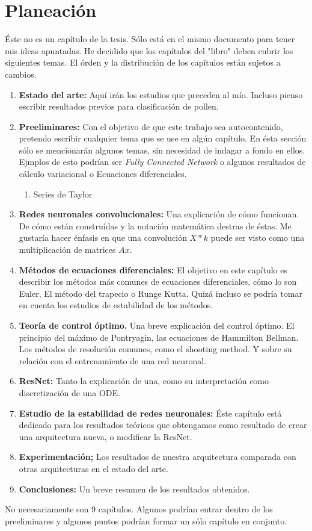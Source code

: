 \chapter{Planeación}
    Éste no es un capítulo de la tesis. Sólo está en el mismo documento para tener mis ideas apuntadas.
    He decidido que los capítulos del "libro" deben cubrir los siguientes temas. El órden y la distribución de los capítulos están sujetos a cambios.
    \begin{enumerate}
        \item \textbf{Estado del arte:} Aquí irán los estudios que preceden al mío. Incluso pienso escribir resultados previos para clasificación de pollen. 
        \item \textbf{Preeliminares:} Con el objetivo de que este trabajo sea autocontenido, pretendo escribir cualquier tema que se use en algún capítulo. En ésta sección sólo se mencionarán algunos temas, sin necesidad de indagar a fondo en ellos. Ejmplos de esto podrían ser \textsl{Fully Connected Network} o algunos resultados de cálculo variacional o Ecuaciones diferenciales.
        \begin{enumerate}
            \item Series de Taylor
        \end{enumerate}
        \item \textbf{Redes neuronales convolucionales:} Una explicación de cómo funcionan. De cómo están construídas y la notación matemática destras de éstas. Me gustaría hacer énfasis en que una convolución $X*k$ puede ser visto como una multiplicación de matrices $Ax$.
        \item  \textbf{Métodos de ecuaciones diferenciales:} El objetivo en este capítulo es describir los métodos más comunes de ecuaciones diferenciales, cómo lo son Euler, El método del trapecio o Runge Kutta. Quizá incluso se podría tomar en cuenta los estudios de estabilidad de los métodos.
        \item  \textbf{Teoría de control óptimo.} Una breve explicación del control óptimo. El principio del máximo de Pontryagin, las ecuaciones de Hammilton Bellman. Los métodos de resolución comunes, como el shooting method. Y sobre su relación con el entrenamiento de una red neuronal.
        \item \textbf{ResNet:} Tanto la explicación de una, como su interpretación como discretización de una ODE.
        \item \textbf{Estudio de la estabilidad de redes neuronales:} Éste capítulo está dedicado para los resultados teóricos que obtengamos como resultado de crear una arquitectura nueva, o modificar la ResNet.
        \item  \textbf{Experimentación;} Los resultados de nuestra arquitectura comparada con otras arquitecturas en el estado del arte.
        \item \textbf{Conclusiones:} Un breve resumen de los resultados obtenidos.
    \end{enumerate}
    No necesariamente son 9 capítulos. Algunos podrían entrar dentro de los preeliminares y algunos puntos podrían formar un sólo capítulo en conjunto.